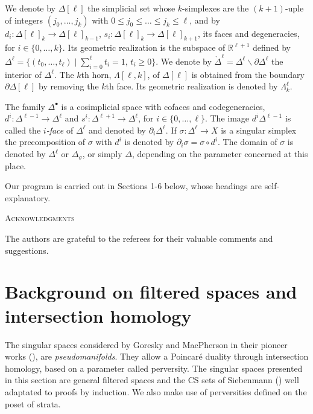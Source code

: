 \documentclass[a4paper,10pt,english,reqno]{amsart}
\theoremstyle{plain}
\theoremstyle{definition}
\theoremstyle{remark}
\numberwithin{equation}{section}
\def\R{{\mathbb R}}
\def\R{\mathbb{R}}
\def\menos{\backslash}
\newcommand{\inte}[1]{\mathring{#1}}
\renewcommand\1{\hbox{\ding{192}}}
\renewcommand\2{\hbox{\ding{193}}}
\newcommand\3{\hbox{\ding{194}}}
\newcommand\4{\hbox{\ding{195}}}
\begin{document}
We denote by $\Delta[\ell]$ the simplicial set whose $k$-simplexes are the $(k+1)$-uple of integers
$(j_{0},\dots,j_{k})$ with $0\leq j_{0}\leq\dots\leq j_{k}\leq \ell$, and by
$d_{i}\colon \Delta[\ell]_{k}\to \Delta[\ell]_{k-1}$,
$s_{i}\colon \Delta[\ell]_{k}\to \Delta[\ell]_{k+1}$,
its faces and degeneracies, for $i\in\{0,\dots,k\}$.
Its geometric realization  is the  subspace of $\R^{\ell+1}$
defined by
$\Delta^{\ell}=\{(t_{0},\dots,t_{\ell})\mid \sum_{i=0}^{\ell}t_{i}=1, \,t_{i}\geq 0\}$.
We denote by $\inte\Delta^\ell=\Delta^\ell\menos \partial \Delta^\ell$ the interior of $\Delta^\ell$.
The $k$th horn, $\Lambda[\ell,k]$, of  $\Delta[\ell]$ is obtained from the boundary 
$\partial \Delta[\ell]$ by removing the $k$th face.
 Its geometric realization is denoted by $\Lambda^{\ell}_{k}$.

The family $\Delta^{\bullet}$ is a cosimplicial space with cofaces and codegeneracies,
$d^i\colon \Delta^{\ell-1}\to \Delta^{\ell}$ and
$s^i\colon \Delta^{\ell+1}\to \Delta^{\ell}$,
for $i\in\{0,\dots,\ell\}$.
The image $d^i\Delta^{\ell-1}$ is called the \emph{$i$-face} of $\Delta^\ell$ and denoted by $\partial_{i}\Delta^\ell$.
If $\sigma\colon \Delta^{\ell}\to X$ is a singular simplex  
the precomposition of $\sigma$ with $d^i$ is denoted by
$\partial_{i}\sigma=\sigma\circ d^i$.
The domain of  $\sigma$ is denoted by
 $\Delta^\ell$ 
or  $\Delta_{\sigma}$, or simply $\Delta$,
depending on the parameter concerned at this place.


%
Our program is carried out in Sections 1-6 below, whose headings are self- explanatory.
\tableofcontents

%
\centerline{\textsc{ Acknowledgments}}

\medskip
The authors are grateful to the referees for their valuable comments and suggestions.

%

\section{Background on filtered spaces and intersection homology}





The singular spaces considered by Goresky and MacPherson in their pioneer works
 (\cite{GM1,GM2}), are  \emph{pseudomanifolds}.
 They allow a Poincar\'e duality through intersection homology, based on a parameter called perversity.
The singular spaces presented in this section are general filtered spaces and the  CS sets  of Siebenmann 
(\cite{MR0319207}) well adaptated to proofs by induction. 
%
We also make use of  perversities defined  on the poset of strata. 
\end{document}
